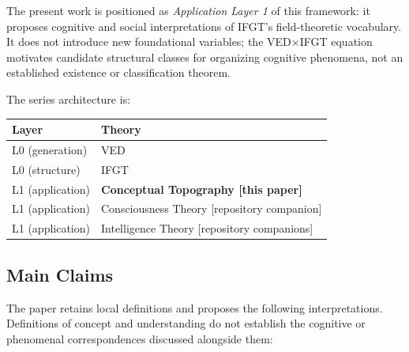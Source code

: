 The present work is positioned as \emph{Application Layer 1} of this
framework: it proposes cognitive and social interpretations of
IFGT's field-theoretic vocabulary.
It does not introduce new foundational variables; the VED$\times$IFGT
equation motivates candidate structural classes for organizing cognitive
phenomena, not an established existence or classification theorem.

The series architecture is:
\begin{center}
\begin{tabular}{ll}
\toprule
Layer & Theory \\
\midrule
L0 (generation) & VED \\
L0 (structure)  & IFGT \\
L1 (application) & \textbf{Conceptual Topography [this paper]} \\
L1 (application) & Consciousness Theory [repository companion] \\
L1 (application) & Intelligence Theory [repository companions] \\
\bottomrule
\end{tabular}
\end{center}

\subsection{Main Claims}

The paper retains local definitions and proposes the following interpretations.
Definitions of concept and understanding do not establish the cognitive or
phenomenal correspondences discussed alongside them:

